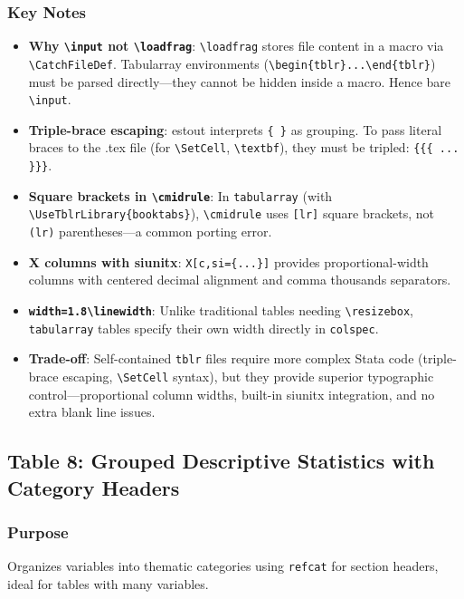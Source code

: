 \documentclass[11pt]{article}
\numberwithin{table}{section}
\begin{document}
\subsubsection{Key Notes}
\begin{itemize}
    \item \textbf{Why \texttt{\textbackslash input} not \texttt{\textbackslash loadfrag}}: \texttt{\textbackslash loadfrag} stores file content in a macro via \texttt{\textbackslash CatchFileDef}. Tabularray environments (\texttt{\textbackslash begin\{tblr\}...\textbackslash end\{tblr\}}) must be parsed directly---they cannot be hidden inside a macro. Hence bare \texttt{\textbackslash input}.
    \item \textbf{Triple-brace escaping}: estout interprets \texttt{\{ \}} as grouping. To pass literal braces to the .tex file (for \texttt{\textbackslash SetCell}, \texttt{\textbackslash textbf}), they must be tripled: \texttt{\{\{\{ ... \}\}\}}.
    \item \textbf{Square brackets in \texttt{\textbackslash cmidrule}}: In \texttt{tabularray} (with \texttt{\textbackslash UseTblrLibrary\{booktabs\}}), \texttt{\textbackslash cmidrule} uses \texttt{[lr]} square brackets, not \texttt{(lr)} parentheses---a common porting error.
    \item \textbf{X columns with siunitx}: \texttt{X[c,si=\{...\}]} provides proportional-width columns with centered decimal alignment and comma thousands separators.
    \item \textbf{\texttt{width=1.8\textbackslash linewidth}}: Unlike traditional tables needing \texttt{\textbackslash resizebox}, \texttt{tabularray} tables specify their own width directly in \texttt{colspec}.
    \item \textbf{Trade-off}: Self-contained \texttt{tblr} files require more complex Stata code (triple-brace escaping, \texttt{\textbackslash SetCell} syntax), but they provide superior typographic control---proportional column widths, built-in siunitx integration, and no extra blank line issues.
\end{itemize}

\clearpage
\subsection{Table 8: Grouped Descriptive Statistics with Category Headers}
\subsubsection{Purpose}
Organizes variables into thematic categories using \texttt{refcat} for section headers, ideal for tables with many variables.
\end{document}
